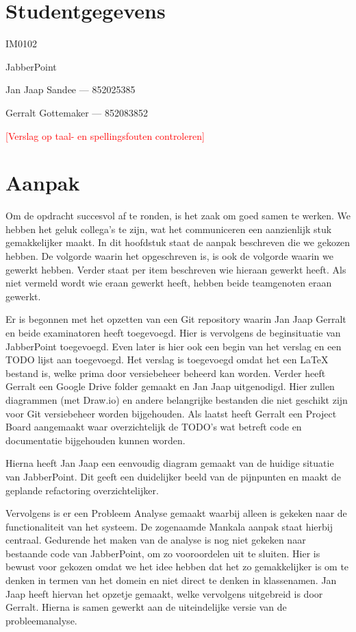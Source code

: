 \documentclass[a4paper]{article}
\newcommand{\todo}[1]{\textcolor{red}{[#1]}}
\newcommand{\1}[0]{\'{e}\'{e}n}
\begin{document}
\pagestyle{fancy}

\section*{Studentgegevens}
\begin{description}
	\item [Cursuscode] IM0102
	\item JabberPoint
    \item Jan Jaap Sandee --- 852025385
	\item Gerralt Gottemaker --- 852083852
\end{description}
\todo{Verslag op taal- en spellingsfouten controleren}

\section*{Aanpak}
Om de opdracht succesvol af te ronden, is het zaak om goed samen te werken. We hebben het geluk collega's te zijn, wat het communiceren een aanzienlijk stuk gemakkelijker maakt. In dit hoofdstuk staat de aanpak beschreven die we gekozen hebben. De volgorde waarin het opgeschreven is, is ook de volgorde waarin we gewerkt hebben. Verder staat per item beschreven wie hieraan gewerkt heeft. Als niet vermeld wordt wie eraan gewerkt heeft, hebben beide teamgenoten eraan gewerkt.

Er is begonnen met het opzetten van een Git repository waarin Jan Jaap Gerralt en beide examinatoren heeft toegevoegd. Hier is vervolgens de beginsituatie van JabberPoint toegevoegd. Even later is hier ook een begin van het verslag en een TODO lijst aan toegevoegd. Het verslag is toegevoegd omdat het een LaTeX bestand is, welke prima door versiebeheer beheerd kan worden. Verder heeft Gerralt een Google Drive folder gemaakt en Jan Jaap uitgenodigd. Hier zullen diagrammen (met Draw.io) en andere belangrijke bestanden die niet geschikt zijn voor Git versiebeheer worden bijgehouden. Als laatst heeft Gerralt een Project Board aangemaakt waar overzichtelijk de TODO's wat betreft code en documentatie bijgehouden kunnen worden.

Hierna heeft Jan Jaap een eenvoudig diagram gemaakt van de huidige situatie van JabberPoint. Dit geeft een duidelijker beeld van de pijnpunten en maakt de geplande refactoring overzichtelijker.

Vervolgens is er een Probleem Analyse gemaakt waarbij alleen is gekeken naar de functionaliteit van het systeem. De zogenaamde Mankala aanpak staat hierbij centraal. Gedurende het maken van de analyse is nog niet gekeken naar bestaande code van JabberPoint, om zo vooroordelen uit te sluiten. Hier is bewust voor gekozen omdat we het idee hebben dat het zo gemakkelijker is om te denken in termen van het domein en niet direct te denken in klassenamen. Jan Jaap heeft hiervan het opzetje gemaakt, welke vervolgens uitgebreid is door Gerralt. Hierna is samen gewerkt aan de uiteindelijke versie van de probleemanalyse.
\end{document}
